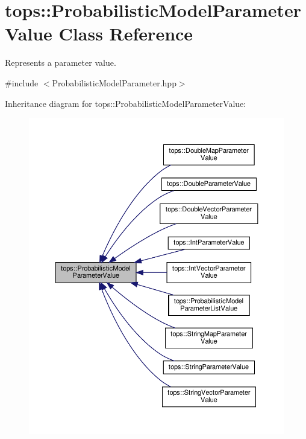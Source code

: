 \hypertarget{classtops_1_1ProbabilisticModelParameterValue}{}\section{tops\+:\+:Probabilistic\+Model\+Parameter\+Value Class Reference}
\label{classtops_1_1ProbabilisticModelParameterValue}


Represents a parameter value.  




{\ttfamily \#include $<$Probabilistic\+Model\+Parameter.\+hpp$>$}



Inheritance diagram for tops\+:\+:Probabilistic\+Model\+Parameter\+Value\+:
\nopagebreak
\begin{figure}[H]
\begin{center}
\leavevmode
\includegraphics[width=350pt]{classtops_1_1ProbabilisticModelParameterValue__inherit__graph}
\end{center}
\end{figure}
